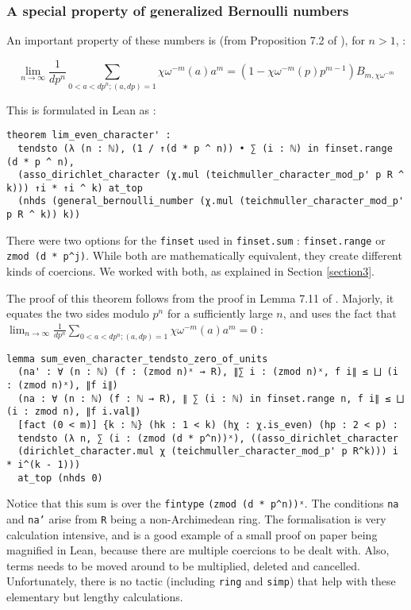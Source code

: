 \documentclass[a4paper,UKenglish,cleveref, autoref, thm-restate]{lipics-v2021}
\newcommand{\lean}[1]{\texttt{#1}\xspace} %
\begin{document}
\subsubsection{A special property of generalized Bernoulli numbers}
An important property of these numbers is (from Proposition 7.2 of \cite{cyc}), for $n > 1$, : 
\begin{theorem}\label{thm1}
$$ \lim_{n \to \infty} \frac{1}{dp^{n}} \sum_{0 < a < dp^{n} ; (a, dp) = 1} \chi \omega^{-m} (a) a^{m} = 
(1 - \chi \omega^{-m} (p) p^{m-1}) B_{m, \chi \omega^{-m}} $$
\end{theorem} 
This is formulated in Lean as :
\begin{lstlisting}
theorem lim_even_character' : 
  tendsto (λ (n : ℕ), (1 / ↑(d * p ^ n)) • ∑ (i : ℕ) in finset.range (d * p ^ n),
  (asso_dirichlet_character (χ.mul (teichmuller_character_mod_p' p R ^ k))) ↑i * ↑i ^ k) at_top
  (nhds (general_bernoulli_number (χ.mul (teichmuller_character_mod_p' p R ^ k)) k))
\end{lstlisting}
There were two options for the \lean{finset} used in \lean{finset.sum} : \lean{finset.range} or \lean{zmod (d * p\textasciicircum j)}. 
While both are mathematically equivalent, they create different kinds of coercions. 
We worked with both, as explained in Section \ref{section3}. %

The proof of this theorem follows from the proof in Lemma 7.11 of \cite{cyc}. Majorly, it equates the two sides modulo $p^n$ for a 
sufficiently large $n$, and uses the fact that $ \lim_{n \to \infty} \frac{1}{dp^{n}} \sum_{0 < a < dp^{n} ; (a, dp) = 1} \chi \omega^{-m} (a) a^{m} = 0 $ :
\begin{lstlisting}
lemma sum_even_character_tendsto_zero_of_units 
  (na' : ∀ (n : ℕ) (f : (zmod n)ˣ → R), ∥∑ i : (zmod n)ˣ, f i∥ ≤ ⨆ (i : (zmod n)ˣ), ∥f i∥)
  (na : ∀ (n : ℕ) (f : ℕ → R), ∥ ∑ (i : ℕ) in finset.range n, f i∥ ≤ ⨆ (i : zmod n), ∥f i.val∥)
  [fact (0 < m)] {k : ℕ} (hk : 1 < k) (hχ : χ.is_even) (hp : 2 < p) :
  tendsto (λ n, ∑ (i : (zmod (d * p^n))ˣ), ((asso_dirichlet_character
  (dirichlet_character.mul χ (teichmuller_character_mod_p' p R^k))) i * i^(k - 1))) 
  at_top (nhds 0) 
\end{lstlisting}
Notice that this sum is over the \lean{fintype} \lean{(zmod (d * p\textasciicircum n))ˣ}. The conditions 
\lean{na} and \lean{na'} arise from \lean{R} being a non-Archimedean ring. 
The formalisation is very calculation intensive, and is a good example of a small proof on paper being magnified in Lean, 
because there are multiple coercions to be dealt with. Also, terms needs to be moved around to be multiplied, deleted and cancelled. 
Unfortunately, there is no tactic (including \lean{ring} and \lean{simp}) that help with these elementary but lengthy calculations.
\end{document}
